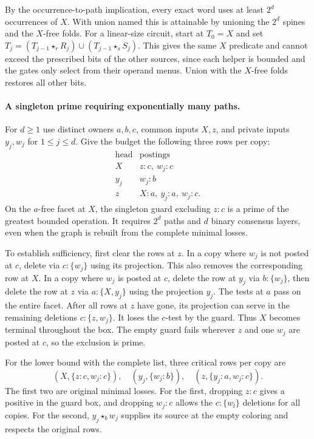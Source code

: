 By the occurrence-to-path implication, every exact word uses
at least $2^d$ occurrences of $X$. With union named this is
attainable by unioning the $2^d$ spines and the $X$-free folds.
For a linear-size circuit, start at $T_0=X$ and set
$T_j=(T_{j-1}\star_r R_j)\cup(T_{j-1}\star_s S_j)$.
This gives the same $X$ predicate and cannot exceed the
prescribed bits of the other sources, since each helper is
bounded and the gates only select from their operand menus.
Union with the $X$-free folds restores all other bits.

\paragraph{A singleton prime requiring exponentially many paths.}
For $d\ge1$ use distinct owners $a,b,c$, common inputs
$X,z$, and private inputs $y_j,w_j$ for $1\le j\le d$.
Give the budget the following three rows per copy:
\[
\begin{array}{c|l}
 \text{head}&\text{postings}\\ \hline
 X& z:c,\ w_j:c\\
 y_j& w_j:b\\
 z& X:a,\ y_j:a,\ w_j:c .
\end{array}
\]
On the $a$-free facet at $X$, the singleton guard
excluding $z:c$ is a prime of the greatest bounded
operation. It requires $2^d$ paths and $d$ binary
consensus layers, even when the graph is rebuilt
from the complete minimal losses.

To establish sufficiency, first clear the rows at
$z$. In a copy where $w_j$ is not posted at $c$,
delete via $c:\{w_j\}$ using its projection. This
also removes the corresponding row at $X$. In a
copy where $w_j$ is posted at $c$, delete the row
at $y_j$ via $b:\{w_j\}$, then delete the row at $z$
via $a:\{X,y_j\}$ using the projection $y_j$.
The tests at $a$ pass on the entire facet. After
all rows at $z$ have gone, its projection can
serve in the remaining deletions
$c:\{z,w_j\}$. It loses the $c$-test by the
guard. Thus $X$ becomes terminal throughout the
box. The empty guard fails wherever $z$ and one
$w_j$ are posted at $c$, so the exclusion is prime.

For the lower bound with the complete list, three
critical rows per copy are
\[
 (X,\{z:c,w_j:c\}),\quad (y_j,\{w_j:b\}),
 \quad (z,\{y_j:a,w_j:c\}).
\]
The first two are original minimal losses. For
the first, dropping $z:c$ gives a positive in
the guard box, and dropping $w_j:c$ allows the
$c:\{w_l\}$ deletions for all copies. For the
second, $y_j\star_b w_j$ supplies its source at
the empty coloring and respects the original rows.

